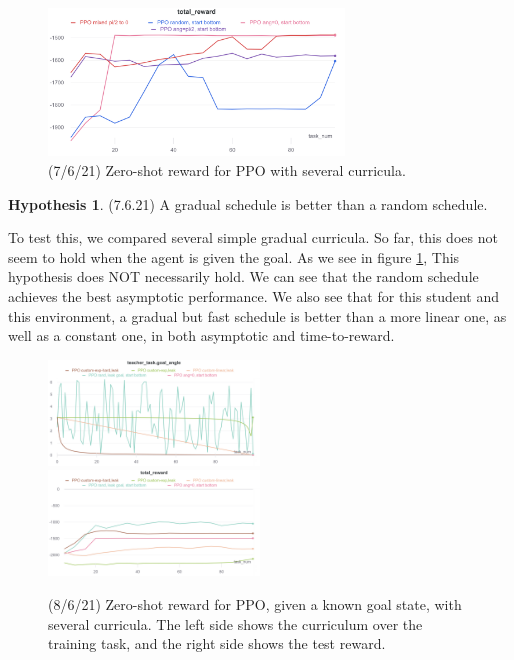 \documentclass[letterpaper]{article}
\theoremstyle{definition}
\newtheorem{hypothesis}{Hypothesis}[section]
\begin{document}
\begin{figure}[h]
	\includegraphics[width=0.7\textwidth]{pend-sched}
	\caption{(7/6/21) Zero-shot reward for PPO with several curricula.}
\end{figure}

\begin{hypothesis} (7.6.21)
	A gradual schedule is better than a random schedule.
\end{hypothesis}
To test this, we compared several simple gradual curricula. So far, this does not seem to hold when the agent is given the goal. As we see in figure \ref{figure:mixed-sched}, This hypothesis does NOT necessarily hold. We can see that the random schedule achieves the best asymptotic performance. We also see that for this student and this environment, a gradual but fast schedule is better than a more linear one, as well as a constant one, in both asymptotic and time-to-reward.


\begin{figure}[h] \label{figure:mixed-sched}
	\includegraphics[width=0.5\textwidth]{mixed-sched-angles}
	\includegraphics[width=0.5\textwidth]{mixed-sched-rewards}
	\caption{(8/6/21) Zero-shot reward for PPO, given a known goal state, with several curricula.
	The left side shows the curriculum over the training task, and the right side shows the test reward.}
\end{figure}
\end{document}
